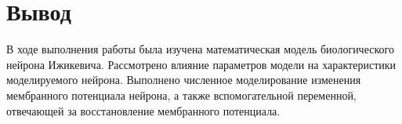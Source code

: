 \chapter{Вывод}
\label{ch:chap6}
В ходе выполнения работы была изучена математическая модель биологического нейрона Ижикевича. Рассмотрено влияние параметров модели на характеристики моделируемого нейрона. Выполнено численное моделирование изменения мембранного потенциала нейрона, а также вспомогательной переменной, отвечающей за восстановление мембранного потенциала.

\endinput